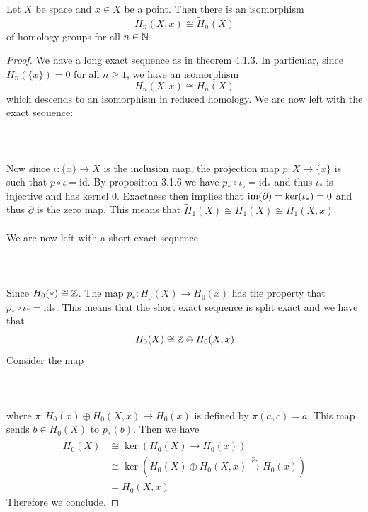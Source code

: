 \documentclass[a4paper]{article}
\begin{document}
\begin{lmm}{}{} Let $X$ be space and $x\in X$ be a point. Then there is an isomorphism $$H_n(X,x)\cong\widetilde{H}_n(X)$$ of homology groups for all $n\in\mathbb{N}$. \tcbline
\begin{proof}
We have a long exact sequence as in theorem 4.1.3. In particular, since $H_n(\{x\})=0$ for all $n\geq 1$, we have an isomorphism $$H_n(X,x)\cong H_n(X)$$ which descends to an isomorphism in reduced homology. We are now left with the exact sequence: \\~\\
\\~\\
Now since $\iota:\{x\}\to X$ is the inclusion map, the projection map $p:X\to\{x\}$ is such that $p\circ\iota=\text{id}$. By proposition 3.1.6 we have $p_\ast\circ\iota_\circ=\text{id}_\ast$ and thus $\iota_\ast$ is injective and has kernel $0$. Exactness then implies that $\operatorname{im}(\partial)=\ker(\iota_\ast)=0$ and thus $\partial$ is the zero map. This means that $\tilde{H}_1(X)\cong H_1(X)\cong H_1(X,x)$. \\~\\

We are now left with a short exact sequence\\~\\
\\~\\
Since $H_0(\ast)\cong\mathbb{Z}$. The map $p_\ast:H_0(X)\to H_0(x)$ has the property that $p_\ast\circ\iota_\ast=\text{id}_\ast$. This means that the short exact sequence is split exact and we have that $$H_0(X)\cong\mathbb{Z}\oplus H_0(X,x)$$ Consider the map \\~\\
\\~\\
where $\pi:H_0(x)\oplus H_0(X,x)\to H_0(x)$ is defined by $\pi(a,c)=a$. This map sends $b\in H_0(X)$ to $p_\ast(b)$. Then we have 
\begin{align*}
\widetilde{H}_0(X)&\cong\ker(H_0(X)\to H_0(x))\\
&\cong\ker(H_0(X)\oplus H_0(X,x)\overset{p_\ast}{\to}H_0(x))\\
&=H_0(X,x)
\end{align*}
Therefore we conclude. 
\end{proof}
\end{lmm}
\end{document}
